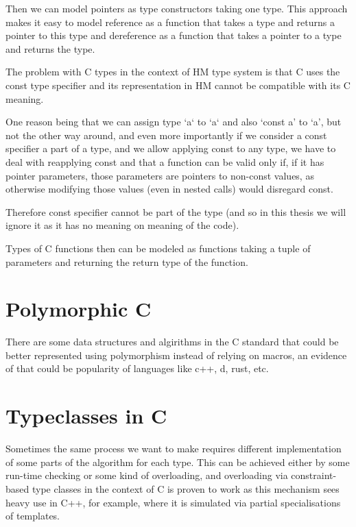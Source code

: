 Then we can model pointers as type constructors taking one type.
This approach makes it easy to model reference as a function that takes a type and returns a pointer to this type
and dereference as a function that takes a pointer to a type and returns the type.

The problem with C types in the context of HM type system is that C uses the const type specifier and its representation
in HM cannot be compatible with its C meaning.

One reason being that we can assign type `a` to `a` and also `const a' to `a', but not the other way around, and even
more importantly if we consider a const specifier a part of a type, and we allow applying const to any type, we have
to deal with reapplying const and that a function can be valid only if, if it has pointer parameters, those parameters
are pointers to non-const values, as otherwise modifying those values (even in nested calls) would disregard const.

Therefore const specifier cannot be part of the type (and so in this thesis we will ignore it as it has no meaning on
meaning of the code).

Types of C functions then can be modeled as functions taking a tuple of parameters and returning the return type of the
function.


\section{Polymorphic C}

There are some data structures and algirithms in the C standard that could be better represented using polymorphism instead of relying on
macros, an evidence of that could be popularity of languages like c++, d, rust, etc.

\section{Typeclasses in C}

Sometimes the same process we want to make requires different implementation of some parts of the algorithm
for each type. This can be achieved either by some run-time checking or some kind of overloading, and overloading via
constraint-based type classes in the context of C is proven to work as this mechanism sees heavy use in C++, for example,
where it is simulated via partial specialisations of templates.



